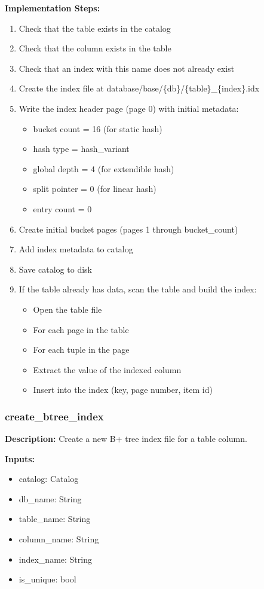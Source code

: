\documentclass[11pt,a4paper]{article}
\begin{document}
\textbf{Implementation Steps:}
\begin{enumerate}
\item Check that the table exists in the catalog
\item Check that the column exists in the table
\item Check that an index with this name does not already exist
\item Create the index file at database/base/\{db\}/\{table\}\_\{index\}.idx
\item Write the index header page (page 0) with initial metadata:
    \begin{itemize}
    \item bucket count = 16 (for static hash)
    \item hash type = hash\_variant
    \item global depth = 4 (for extendible hash)
    \item split pointer = 0 (for linear hash)
    \item entry count = 0
    \end{itemize}
\item Create initial bucket pages (pages 1 through bucket\_count)
\item Add index metadata to catalog
\item Save catalog to disk
\item If the table already has data, scan the table and build the index:
    \begin{itemize}
    \item Open the table file
    \item For each page in the table
    \item For each tuple in the page
    \item Extract the value of the indexed column
    \item Insert into the index (key, page number, item id)
    \end{itemize}
\end{enumerate}

\subsubsection{create\_btree\_index}

\textbf{Description:} Create a new B+ tree index file for a table column.

\textbf{Inputs:}
\begin{itemize}
\item catalog: Catalog
\item db\_name: String
\item table\_name: String
\item column\_name: String
\item index\_name: String
\item is\_unique: bool
\end{itemize}
\end{document}
